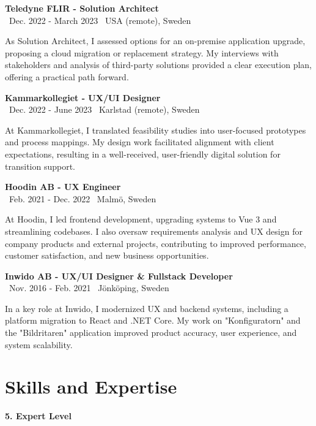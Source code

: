 \documentclass[a4paper,10pt]{article}
\begin{document}
\vspace{0.5cm}
\textbf{Teledyne FLIR - Solution Architect}\\
\normalsize \faCalendar \ Dec. 2022 - March 2023 \quad \faMapMarker \ USA (remote), Sweden

As Solution Architect, I assessed options for an on-premise application upgrade, proposing a cloud migration or replacement strategy. My interviews with stakeholders and analysis of third-party solutions provided a clear execution plan, offering a practical path forward.

\vspace{0.5cm}
\textbf{Kammarkollegiet - UX/UI Designer}\\
\normalsize \faCalendar \ Dec. 2022 - June 2023 \quad \faMapMarker \ Karlstad (remote), Sweden

At Kammarkollegiet, I translated feasibility studies into user-focused prototypes and process mappings. My design work facilitated alignment with client expectations, resulting in a well-received, user-friendly digital solution for transition support.

\vspace{0.5cm}
\textbf{Hoodin AB - UX Engineer}\\
\normalsize \faCalendar \ Feb. 2021 - Dec. 2022 \quad \faMapMarker \ Malmö, Sweden

At Hoodin, I led frontend development, upgrading systems to Vue 3 and streamlining codebases. I also oversaw requirements analysis and UX design for company products and external projects, contributing to improved performance, customer satisfaction, and new business opportunities.

\vspace{0.5cm}
\textbf{Inwido AB - UX/UI Designer \& Fullstack Developer}\\
\normalsize \faCalendar \ Nov. 2016 - Feb. 2021 \quad \faMapMarker \ Jönköping, Sweden

In a key role at Inwido, I modernized UX and backend systems, including a platform migration to React and .NET Core. My work on "Konfiguratorn" and the "Bildritaren" application improved product accuracy, user experience, and system scalability.

\section*{Skills and Expertise}

\textbf{5. Expert Level}
\end{document}
